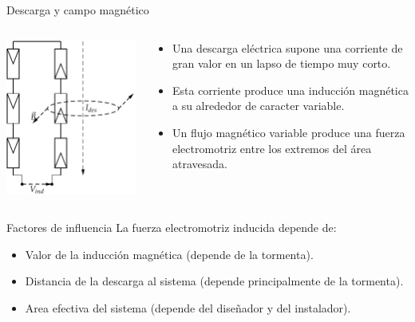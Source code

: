 \documentclass[xcolor={usenames,svgnames,dvipsnames}]{beamer}
\begin{document}
\begin{frame}[plain,label={sec:orgdba0c37}]{Descarga y campo magnético}
\begin{columns}
\begin{column}{0.6\columnwidth}
\begin{center}
\includegraphics[height=0.8\textheight]{../figs/SobretensionInducida.pdf}
\end{center}
\end{column}
\begin{column}{0.6\columnwidth}
\begin{itemize}
\item Una descarga eléctrica supone una \alert{corriente de gran valor} en un lapso de \alert{tiempo muy corto}.

\item Esta corriente produce una \alert{inducción magnética} a su alrededor de caracter \alert{variable}.

\item Un flujo magnético variable produce una \alert{fuerza electromotriz} entre los extremos del área atravesada.
\end{itemize}
\end{column}
\end{columns}
\end{frame}

\begin{frame}[label={sec:orge02cf9d}]{Factores de influencia}
La fuerza electromotriz inducida depende de:

\begin{itemize}
\item \alert{Valor de la inducción magnética} (depende de la tormenta).

\item \alert{Distancia} de la descarga al sistema (depende principalmente de la
tormenta).

\item \alert{Area efectiva del sistema} (depende del diseñador y del instalador).
\end{itemize}
\end{frame}
\end{document}
